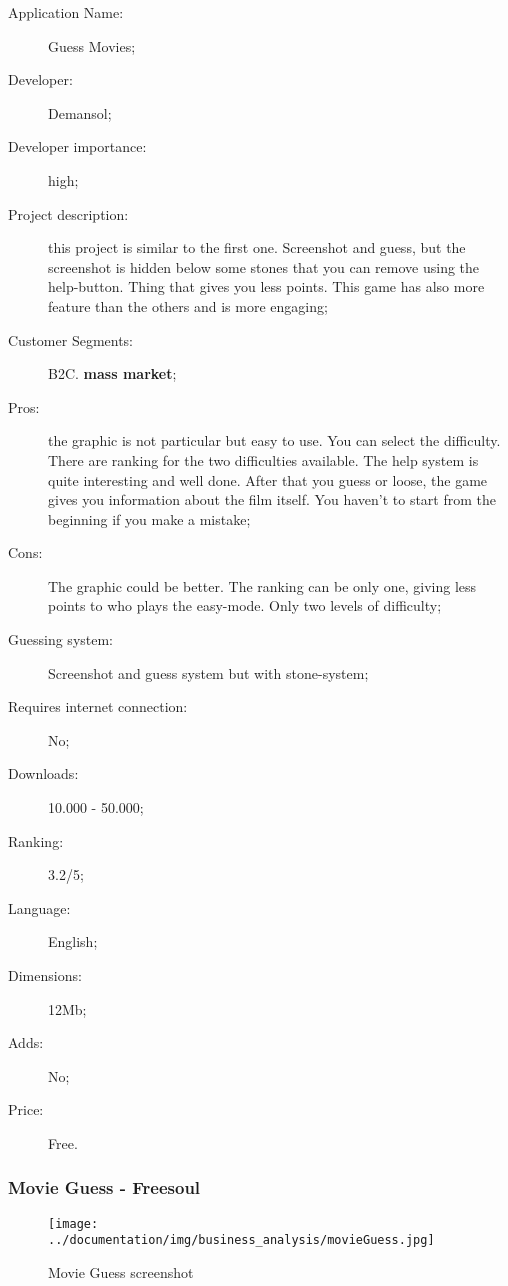 \begin{description}
\item[Application Name:] Guess Movies;
\item[Developer:] Demansol;
\item[Developer importance:] high;
\item[Project description:] this project is similar to the first one. Screenshot and guess, but the screenshot is hidden below some stones that you can remove using the help-button. Thing that gives you less points. This game has also more feature than the others and is more engaging;
\item[Customer Segments:] B2C. \textbf{mass market};
\item[Pros:] the graphic is not particular but easy to use. You can select the difficulty. There are ranking for the two difficulties available. The help system is quite interesting and well done. After that you guess or loose, the game gives you information about the film itself. You haven't to start from the beginning if you make a mistake;
\item[Cons:] The graphic could be better. The ranking can be only one, giving less points to who plays the easy-mode. Only two levels of difficulty;
\item[Guessing system:] Screenshot and guess system but with stone-system;
\item[Requires internet connection:] No;
\item[Downloads:] 10.000 - 50.000;
\item[Ranking:] 3.2/5;
\item[Language:] English;
\item[Dimensions:] 12Mb;
\item[Adds:] No;
\item[Price:] Free.
\end{description}

\subsubsection{Movie Guess - Freesoul}

\begin{figure}[H]
\centering %
\texttt{[image: ../documentation/img/business\_analysis/movieGuess.jpg]}
\caption{Movie Guess screenshot}
\label{fig:movieGuess}
\end{figure}

